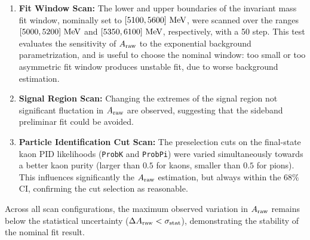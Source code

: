 \begin{enumerate}[leftmargin=*]
    \item \textbf{Fit Window Scan:} The lower and upper boundaries of the invariant mass fit window, nominally set to $[5100, 5600]\,\,\text{Me\hspace{-.08em}V}$, were scanned over the ranges $[5000, 5200]\,\,\text{Me\hspace{-.08em}V}$ and $[5350, 6100]\,\,\text{Me\hspace{-.08em}V}$, respectively, with a 50 \MeV step. This test evaluates the sensitivity of $A_{\mathrm{raw}}$ to the exponential background parametrization, and is useful to choose the nominal window: too small or too asymmetric fit window produces unstable fit, due to worse background estimation.

    \item \textbf{Signal Region Scan:} Changing the extremes of the signal region not significant fluctation in $A_{\mathrm{raw}}$ are observed, suggesting that the sideband preliminar fit could be avoided.

    \item \textbf{Particle Identification Cut Scan:} The preselection cuts on the final-state kaon PID likelihoods (\texttt{ProbK} and \texttt{ProbPi}) were varied simultaneously towards a better kaon purity (larger than $0.5$ for kaons, smaller than $0.5$ for pions). This influences significantly the $A_{\mathrm{raw}}$ estimation, but always within the $68\%$ CI, confirming the cut selection as reasonable.
\end{enumerate}

Across all scan configurations, the maximum observed variation in $A_{\mathrm{raw}}$ remains below the statistical uncertainty ($\Delta A_{\mathrm{raw}} < \sigma_{\mathrm{stat}}$), demonstrating the stability of the nominal fit result.
